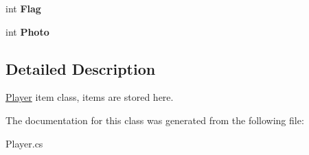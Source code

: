 \begin{DoxyCompactItemize}
\item 
\hypertarget{classSharpenguin_1_1Data_1_1PlayerItem_aa80412dfea49c4c0a50db79fdf3a7cad}{int {\bfseries \-Flag}}\label{classSharpenguin_1_1Data_1_1PlayerItem_aa80412dfea49c4c0a50db79fdf3a7cad}

\item 
\hypertarget{classSharpenguin_1_1Data_1_1PlayerItem_aef51d5f603c79428ced3d1ba525b5850}{int {\bfseries \-Photo}}\label{classSharpenguin_1_1Data_1_1PlayerItem_aef51d5f603c79428ced3d1ba525b5850}

\end{DoxyCompactItemize}


\subsection{\-Detailed \-Description}
\hyperlink{classSharpenguin_1_1Data_1_1Player}{\-Player} item class, items are stored here. 

\-The documentation for this class was generated from the following file\-:\begin{DoxyCompactItemize}
\item 
\-Player.\-cs\end{DoxyCompactItemize}
